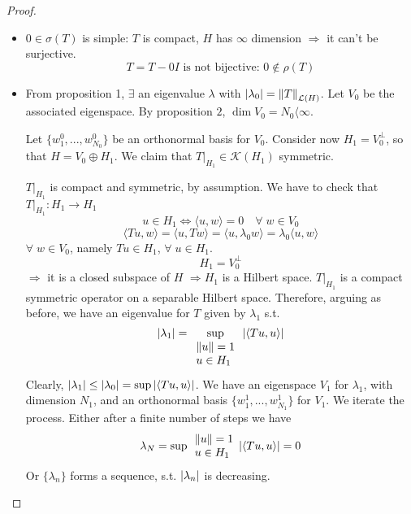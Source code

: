 \begin{proof}
    \begin{itemize}
        \item \(0 \in \sigma(T)\) is simple: \(T \) is compact, \(H\) has \(\infty\) dimension \(\Rightarrow\) it can't be surjective.
        \[
            T = T - 0 I \text{ is not bijective: } 0 \notin \rho(T)
        \]
        \item From proposition 1, \(\exists \) an eigenvalue \(\lambda\) with \(\abs{\lambda_0} = \norm{T}_{\mathcal{L}(H)}\). Let \(V_0\) be the associated eigenspace. By proposition \(2\), \(\dim V_0 = N_0 \langle \infty\).
        
        Let \(\{w_1^0, ..., w_{N_0}^0\}\) be an orthonormal basis for \(V_0\). Consider now \(H_1 = V_0^\perp\), so that \(H = V_0 \oplus H_1\). We claim that \(T|_{H_1} \in \mathcal{K}(H_1)\) symmetric. 

        \(T|_{H_1}\) is compact and symmetric, by assumption. We have to check that \(T|_{H_1}: H_1 \to H_1\)
        \[
            u \in H_1 \Leftrightarrow \langle u, w\rangle = 0 \quad \forall\; w \in V_0
        \]
        \[
            \langle Tu, w\rangle = \langle u, Tw\rangle = \langle u, \lambda_0 w\rangle = \lambda_0 \langle u, w\rangle
        \]
        \(\forall\; w \in V_0\), namely \(Tu \in H_1\), \(\forall\; u \in H_1\). 
        \[
            H_1 = V_0^\perp
        \]
        \(\Rightarrow\) it is a closed subspace of \(H\) \(\Rightarrow H_1\) is a Hilbert space.
        \(T|_{H_1}\) is a compact symmetric operator on a separable Hilbert space. Therefore, arguing as before, we have an eigenvalue for \(T\) given by \(\lambda_1\) s.t. 
        \[
            \abs{\lambda_1} = \sup_{
            \begin{array}{l}
                \norm{u} = 1 \\
                u \in H_1    
            \end{array}}
            \abs{\langle Tu, u\rangle}
        \]
        Clearly, \(\abs{\lambda_1} \leq \abs{\lambda_0} = \sup \abs{\langle Tu, u\rangle}\).
        We have an eigenspace \(V_1 \) for \(\lambda_1\), with dimension \(N_1\), and an orthonormal basis \(\{w_1^1, ..., w_{N_1}^1\}\) for \(V_1\). We iterate the process. 
        Either after a finite number of steps we have
        \[
            \lambda_N = \sup{\begin{array}{l}
                \norm{u} = 1 \\
                u \in H_1    
            \end{array}} \abs{\langle Tu, u\rangle} = 0
        \]
        Or \(\{\lambda_n\}\) forms a sequence, s.t. \(\abs{\lambda_n}\) is decreasing.


\end{itemize}
\end{proof}
